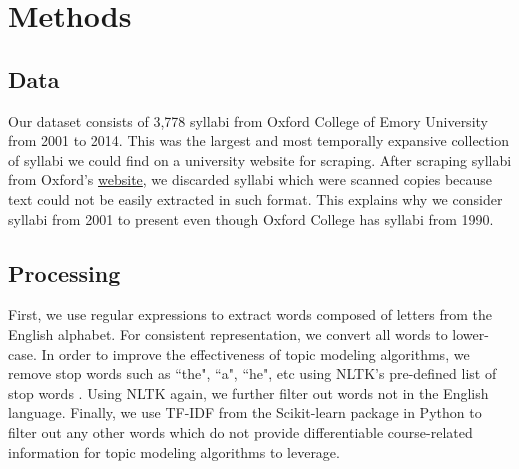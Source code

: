 \documentclass[fleqn,10pt]{JLA_article} %
\begin{document}

\section{Methods}

\subsection{Data}
Our dataset consists of 3,778 syllabi from Oxford College of Emory University from 2001 to 2014. This was the largest and most temporally expansive collection of syllabi we could find on a university website for scraping. After scraping syllabi from Oxford's \href{https://app.oxford.emory.edu/WebApps/Directories/EResources/index.cfm}{website}, we discarded syllabi which were scanned copies because text could not be easily extracted in such format. This explains why we consider syllabi from 2001 to present even though Oxford College has syllabi from 1990.
\subsection{Processing}
First, we use regular expressions to extract words composed of letters from the English alphabet. For consistent representation, we convert all words to lower-case. In order to improve the effectiveness of topic modeling algorithms, we remove stop words such as ``the", ``a", ``he", etc using NLTK's pre-defined list of stop words  \cite{Loper02nltk:the}. Using NLTK again, we further filter out words not in the English language. Finally, we use TF-IDF from the Scikit-learn package in Python \cite{Pedregosa} to filter out any other words which do not provide differentiable course-related information for topic modeling algorithms to leverage. 
\end{document}
